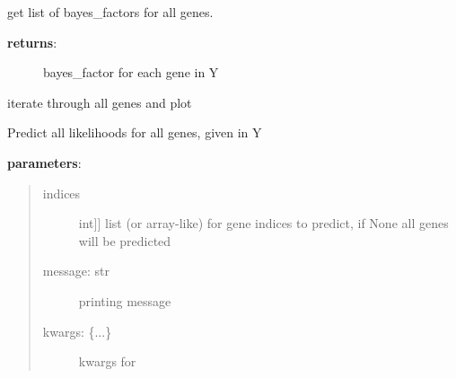 \documentclass[letterpaper,10pt]{sphinxmanual}
\begin{document}
\begin{fulllineitems}
\begin{fulllineitems}
\label{base:gptwosample.twosample.twosample.TwoSample.bayes_factors}
get list of bayes\_factors for all genes.
\begin{description}
\item[{\textbf{returns}:}] \leavevmode
bayes\_factor for each gene in Y

\end{description}

\end{fulllineitems}


\begin{fulllineitems}
\label{base:gptwosample.twosample.twosample.TwoSample.plot}
iterate through all genes and plot

\end{fulllineitems}


\begin{fulllineitems}
\label{base:gptwosample.twosample.twosample.TwoSample.predict_likelihoods}
Predict all likelihoods for all genes, given in Y

\textbf{parameters}:
\begin{quote}
\begin{description}
\item[{indices}] \leavevmode{[}{[}int{]}{]}
list (or array-like) for gene indices to predict, if None all genes will be predicted

\item[{message: str}] \leavevmode
printing message

\item[{kwargs: \{...\}}] \leavevmode
kwargs for 

\end{description}
\end{quote}


\end{fulllineitems}
\end{fulllineitems}
\end{document}
